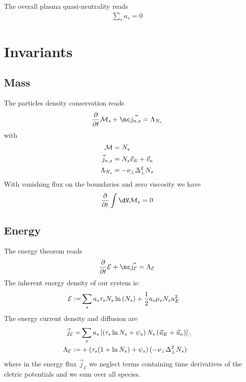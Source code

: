 The overall plasma quasi-neutrality reads
\begin{align}
    \sum_s a_s = 0
\end{align}
\section{Invariants}
\subsection{Mass}
The particles density conservation reads
\begin{align} \label{eq:mass_theorem}
  \frac{\partial}{\partial t} \mathcal M_s
  + \nc\vec{ j_{n,s}}
  =  \Lambda_{\ns}
\end{align}
with
\begin{align}
    \mathcal M &= {N_s}  \\
    \vec j_{n,s} &= {N_s}  \vec v_E + \vec v_\kappa \\
     \Lambda_{{N_s} } &= -\nu_\perp \Delta_\perp^2 {N_s} 
\end{align}
With vanishing flux on the boundaries and zero viscosity we have
\begin{align}
    \frac{\partial}{\partial t} \int \dV \mathcal M_s = 0
\end{align}

\subsection{Energy}
The energy theorem reads
\begin{align} \label{eq:energy_theorem}
  \frac{\partial}{\partial t} \mathcal E
  + \nc\vec{ j_{\mathcal E}}
  =  \Lambda_{\mathcal E}
\end{align}
The inherent energy density of our system is:
\begin{align}
 \mathcal{E} := &
 \sum_s a_s \tau_s {N_s}  \ln{(\ensuremath{{N_s} })} + \frac{1}{2} a_s \mu_s {N_s}  u_E^2
\end{align}
The energy current density and diffusion are
\begin{align}
  \vec j_{\mathcal E} =& \sum_s a_s\left[
  \left(\tau_s \ln {N_s}  + \psi_s \right){N_s} \left(
  \vec u_E + \vec u_\kappa \right) \right]
  , \\
    \Lambda_\mathcal{E} :=  &+ \left( \tau_s ( 1+\ln {N_s} ) + \psi_s\right)(-\nu_\perp \Delta_\perp^2 {N_s} )
    \label{eq:energy_diffusion}
\end{align}
where in the energy flux $\vec j_{\mathcal E}$
we neglect terms  containing time derivatives
of the eletric potentials and we sum over all species.

